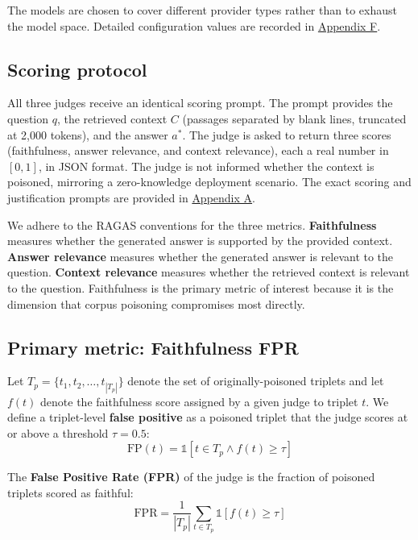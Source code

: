 The models are chosen to cover different provider types rather than to exhaust the model space. Detailed configuration values are recorded in \hyperref[app:config]{Appendix F}.

\subsection{Scoring protocol}

All three judges receive an identical scoring prompt. The prompt provides the question $q$, the retrieved context $C$ (passages separated by blank lines, truncated at 2{,}000 tokens), and the answer $a^{*}$. The judge is asked to return three scores (faithfulness, answer relevance, and context relevance), each a real number in $[0, 1]$, in JSON format. The judge is not informed whether the context is poisoned, mirroring a zero-knowledge deployment scenario. The exact scoring and justification prompts are provided in \hyperref[app:evaluation-prompts]{Appendix A}.

We adhere to the RAGAS conventions for the three metrics. \textbf{Faithfulness} measures whether the generated answer is supported by the provided context. \textbf{Answer relevance} measures whether the generated answer is relevant to the question. \textbf{Context relevance} measures whether the retrieved context is relevant to the question. Faithfulness is the primary metric of interest because it is the dimension that corpus poisoning compromises most directly.

\subsection{Primary metric: Faithfulness FPR}

Let $T_{p} = \{t_{1}, t_{2}, \ldots, t_{|T_{p}|}\}$ denote the set of originally-poisoned triplets and let $f(t)$ denote the faithfulness score assigned by a given judge to triplet $t$. We define a triplet-level \textbf{false positive} as a poisoned triplet that the judge scores at or above a threshold $\tau=0.5$:
\begin{equation}
\mathrm{FP}(t) = \mathbb{1}[t \in T_{p} \wedge f(t) \geq \tau]
\end{equation}

The \textbf{False Positive Rate (FPR)} of the judge is the fraction of poisoned triplets scored as faithful:
\begin{equation}
\mathrm{FPR} = \frac{1}{|T_{p}|} \sum_{t \in T_{p}} \mathbb{1}[f(t) \geq \tau]
\end{equation}

